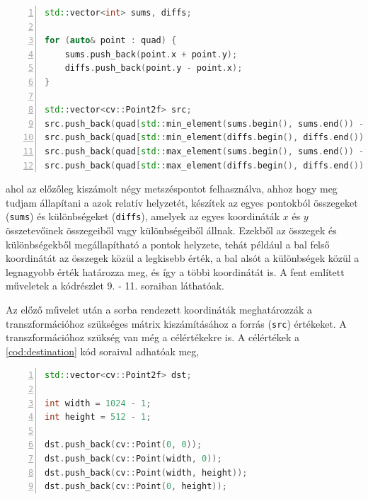 \vspace{5mm}
\hspace{-10mm}
\begin{minipage}{\linewidth}
\begin{lstlisting}[language=C++, numbers=left, caption={Átrendező algoritmus.}, label={cod:atrendezes}]
std::vector<int> sums, diffs;

for (auto& point : quad) {
    sums.push_back(point.x + point.y);
    diffs.push_back(point.y - point.x);
}

std::vector<cv::Point2f> src;
src.push_back(quad[std::min_element(sums.begin(), sums.end()) - sums.begin()]);
src.push_back(quad[std::min_element(diffs.begin(), diffs.end()) - diffs.begin()]);
src.push_back(quad[std::max_element(sums.begin(), sums.end()) - sums.begin()]);
src.push_back(quad[std::max_element(diffs.begin(), diffs.end()) - diffs.begin()]);
\end{lstlisting}
\end{minipage}

\par ahol az előzőleg kiszámolt négy metszéspontot felhasználva, ahhoz hogy meg tudjam állapítani a azok relatív helyzetét, készítek az egyes pontokból összegeket (\lstinline{sums}) és különbségeket (\lstinline{diffs}), amelyek az egyes koordináták $x$ és $y$ összetevőinek összegeiből vagy különbségeiből állnak. Ezekből az összegek és különbségekből megállapítható a pontok helyzete, tehát például a bal felső koordinátát az összegek közül a legkisebb érték, a bal alsót a különbségek közül a legnagyobb érték határozza meg, és így a többi koordinátát is. A fent említett műveletek a kódrészlet 9. - 11. soraiban láthatóak.
\par Az előző művelet után a sorba rendezett koordináták meghatározzák a transzformációhoz szükséges mátrix kiszámításához a forrás (\lstinline{src}) értékeket. A transzformációhoz szükség van még a célértékekre is.
\newline A célértékek a \ref{cod:destination} kód soraival adhatóak meg,

\vspace{5mm}
\hspace{-10mm}
\begin{minipage}{\linewidth}
\begin{lstlisting}[language=C++, numbers=left, caption={A kimeneti értékek megadása.}, label={cod:destination}]
std::vector<cv::Point2f> dst;

int width = 1024 - 1;
int height = 512 - 1;

dst.push_back(cv::Point(0, 0));
dst.push_back(cv::Point(width, 0));
dst.push_back(cv::Point(width, height));
dst.push_back(cv::Point(0, height));
\end{lstlisting}
\end{minipage}

